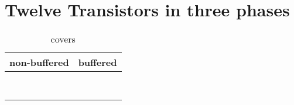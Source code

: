 \section{Twelve Transistors in three  phases}

\begin{table}[ht]
\centering
\caption*{covers}

\begin{tabular}{cc}
    \toprule
    non-buffered & buffered \\
    \midrule

    \nameref{cell:AOOAI213} & \nameref{cell:AOOA213} \\
    \nameref{cell:OAAOI213} & \nameref{cell:OAAO213} \\
    \nameref{cell:AOOAI222} & \nameref{cell:AOOA222} \\
    \nameref{cell:OAAOI222} & \nameref{cell:OAAO222} \\
    \nameref{cell:AAOAI2211} & \nameref{cell:AAOA2211} \\
    \nameref{cell:OOAOI2211} & \nameref{cell:OOAO2211} \\
    \nameref{cell:AAOOAI222} & \nameref{cell:AAOOA222} \\
    \nameref{cell:OOAAOI222} & \nameref{cell:OOAAO222}

\end{tabular}

\end{table}

